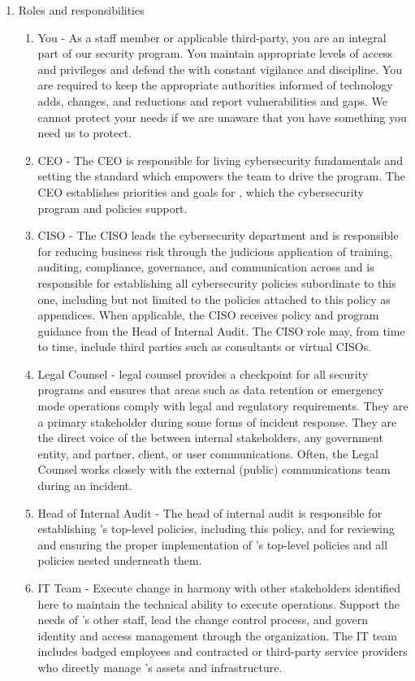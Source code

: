 \documentclass[../main.tex]{subfiles}
\begin{document}
\begin{enumerate}
\begin{enumerate}
  \end{enumerate}
  \item Roles and responsibilities
  \begin{enumerate}
    \item You - As a \CompanyName staff member or applicable third-party, you are an integral part of our security program. You maintain appropriate levels of access and privileges and defend the \CompanyName with constant vigilance and discipline. You are required to keep the appropriate authorities informed of technology adds, changes, and reductions and report vulnerabilities and gaps. We cannot protect your needs if we are unaware that you have something you need us to protect.
    \item CEO - The CEO is responsible for living cybersecurity fundamentals and setting the standard which empowers the team to drive the program. The CEO establishes priorities and goals for \CompanyName, which the cybersecurity program and policies support.
    \item CISO - The CISO leads the cybersecurity department and is responsible for reducing business risk through the judicious application of training, auditing, compliance, governance, and communication across \CompanyName and is responsible for establishing all cybersecurity policies subordinate to this one, including but not limited to the policies attached to this policy as appendices. When applicable, the CISO receives policy and program guidance from the Head of Internal Audit. The CISO role may, from time to time, include third parties such as consultants or virtual CISOs.
    \item Legal Counsel - \CompanyName legal counsel provides a checkpoint for all security programs and ensures that areas such as data retention or emergency mode operations comply with legal and regulatory requirements. They are a primary stakeholder during some forms of incident response. They are the direct voice of the \CompanyName between internal stakeholders, any government entity, and partner, client, or user communications. Often, the Legal Counsel works closely with the external (public) communications team during an incident.
    \item Head of Internal Audit - The head of internal audit is responsible for establishing \CompanyName’s top-level policies, including this policy, and for reviewing and ensuring the proper implementation of \CompanyName’s top-level policies and all policies nested underneath them.
    \item IT Team - Execute change in harmony with other stakeholders identified here to maintain the technical ability to execute \CompanyName operations. Support the needs of \CompanyName’s other staff, lead the change control process, and govern identity and access management through the organization. The IT team includes badged employees and contracted or third-party service providers who directly manage \CompanyName’s assets and infrastructure.

\end{enumerate}
\end{enumerate}
\end{document}

